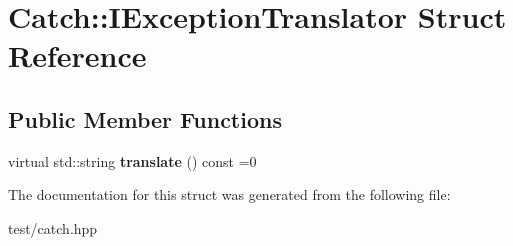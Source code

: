 \hypertarget{structCatch_1_1IExceptionTranslator}{}\section{Catch\+:\+:I\+Exception\+Translator Struct Reference}
\label{structCatch_1_1IExceptionTranslator}
\subsection*{Public Member Functions}
\begin{DoxyCompactItemize}
\item 
virtual std\+::string {\bfseries translate} () const =0\hypertarget{structCatch_1_1IExceptionTranslator_ade89aa305d8c89576521e76b2d1f82eb}{}\label{structCatch_1_1IExceptionTranslator_ade89aa305d8c89576521e76b2d1f82eb}

\end{DoxyCompactItemize}


The documentation for this struct was generated from the following file\+:\begin{DoxyCompactItemize}
\item 
test/catch.\+hpp\end{DoxyCompactItemize}
